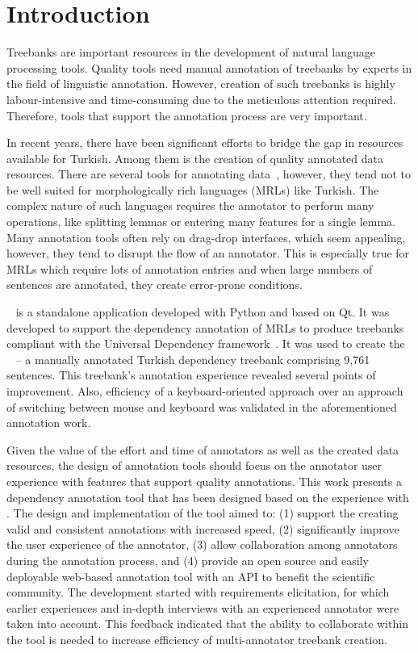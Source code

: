 \section{Introduction}
\label{sec:introduction}

Treebanks are important resources in the development of natural language processing tools.
Quality tools need manual annotation of treebanks by experts in the field of linguistic annotation.
However, creation of such treebanks is highly labour-intensive and time-consuming due to the meticulous attention required.
Therefore, tools that support the annotation process are very important.

In recent years, there have been significant efforts to bridge the gap in resources available for Turkish.
Among them is the creation of quality annotated data resources.
There are several tools for annotating data~\cite{UD}, however, they tend not to be well suited for morphologically rich languages (MRLs) like Turkish.
The complex nature of such languages requires the annotator to perform many operations, like splitting lemmas or entering many features for a single lemma.
Many annotation tools often rely on drag-drop interfaces, which seem appealing, however, they tend to disrupt the flow of an annotator.
This is especially true for MRLs which require lots of annotation entries and when large numbers of sentences are annotated, they create error-prone conditions. %

\boatvone~\cite{trk2020resources} is a standalone application developed with Python and based on Qt.
It was developed to support the dependency annotation of MRLs to produce treebanks compliant with the Universal Dependency framework~\cite{UD}.
It was used to create the \bountreebank~\cite{turk-etal-2019-turkish,trk2020resources,UD-Boun-Treebank} -- a manually annotated Turkish dependency treebank comprising 9,761 sentences.
This treebank's annotation experience revealed several points of improvement.
Also, efficiency of a keyboard-oriented approach over an approach of switching between mouse and keyboard was validated in the aforementioned annotation work.

Given the value of the effort and time of annotators as well as the created data resources, the design of annotation tools should focus on the annotator user experience with features that support quality annotations.
This work presents a dependency annotation tool that has been designed based on the experience with \boatvone.
The design and implementation of the tool aimed to: (1) support the creating valid and consistent annotations with increased speed, (2) significantly improve the user experience of the annotator, (3) allow collaboration among annotators during the annotation process, and (4) provide an open source and easily deployable web-based annotation tool with an API to benefit the scientific community.
The development started with requirements elicitation, for which earlier experiences and in-depth interviews with an experienced annotator were taken into account.
This feedback indicated that the ability to collaborate within the tool is needed to increase efficiency of multi-annotator treebank creation.

